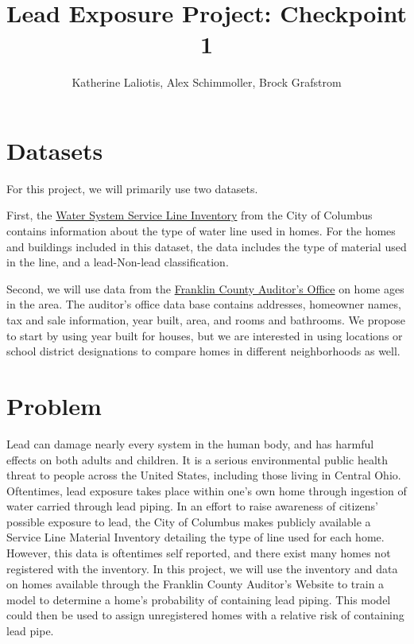 \documentclass{article}
\title{Lead Exposure Project: Checkpoint 1}
\author{Katherine Laliotis, Alex Schimmoller, Brock Grafstrom}
\begin{document}
\maketitle

\section{Datasets}

For this project, we will primarily use two datasets.

First, the \href{https://experience.arcgis.com/experience/1ddfc9ee51ae4eddbdf8003c81eef7e4/}{Water System Service Line Inventory} from the City of Columbus contains information about the type of water line used in homes. For the  homes and buildings included in this dataset, the data includes the type of material used in the line, and a lead-Non-lead classification. 

Second, we will use data from the \href{https://property.franklincountyauditor.com/_web/maps/mapadv.aspx}{Franklin County Auditor's Office} on home ages in the area. The auditor's office data base contains addresses, homeowner names, tax and sale information, year built, area, and rooms and bathrooms. We propose to start by using year built for houses, but we are interested in using locations or school district designations to compare homes in different neighborhoods as well.

\section{Problem}


Lead can damage nearly every system in the human body, and has harmful effects on both adults and children. It is a serious environmental public health threat to people across the United States, including those living in Central Ohio. Oftentimes, lead exposure takes place within one’s own home through ingestion of water carried through lead piping. In an effort to raise awareness of citizens’ possible exposure to lead, the City of Columbus makes publicly available a Service Line Material Inventory detailing the type of line used for each home. However, this data is oftentimes self reported, and there exist many homes not registered with the inventory. In this project, we will use the inventory and data on homes available through the Franklin County Auditor’s Website to train a model to determine a home’s probability of containing lead piping. This model could then be used to assign unregistered homes with a relative risk of containing lead pipe. 
\end{document}
